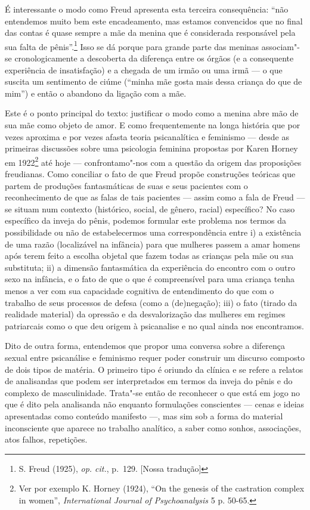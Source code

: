 É interessante o modo como Freud apresenta esta terceira consequência:
``não entendemos muito bem este encadeamento, mas estamos convencidos
que no final das contas é quase sempre a mãe da menina que é considerada
responsável pela sua falta de pênis''.\footnote{S. Freud (1925),
  \emph{op. cit.}, p.~129. {[}Nossa tradução{]}} Isso se dá porque para
grande parte das meninas associam"-se cronologicamente a descoberta da
diferença entre os órgãos (e a consequente experiência de insatisfação)
e a chegada de um irmão ou uma irmã --- o que suscita um sentimento de
ciúme (``minha mãe gosta mais dessa criança do que de mim'') e então o
abandono da ligação com a mãe.

Este é o ponto principal do texto: justificar o modo como a menina abre
mão de sua mãe como objeto de amor. E como frequentemente na longa
história que por vezes aproxima e por vezes afasta teoria psicanalítica
e feminismo --- desde as primeiras discussões sobre uma psicologia
feminina propostas por Karen Horney em 1922\footnote{Ver por exemplo K.
  Horney (1924), ``On the genesis of the castration complex in women'',
  \emph{International Journal of Psychoanalysis} 5 p. 50-65.} até hoje
--- confrontamo"-nos com a questão da origem das proposições freudianas.
Como conciliar o fato de que Freud propõe construções teóricas que
partem de produções fantasmáticas de suas e seus pacientes com o
reconhecimento de que as falas de tais pacientes --- assim como a fala de
Freud --- se situam num contexto (histórico, social, de gênero, racial)
específico? No caso específico da inveja do pênis, podemos formular
este problema nos termos da possibilidade ou não de estabelecermos uma
correspondência entre i) a existência de uma razão (localizável na
infância) para que mulheres passem a amar homens após terem feito a
escolha objetal que fazem todas as crianças pela mãe ou sua substituta;
ii) a dimensão fantasmática da experiência do encontro com o outro sexo
na infância, e o fato de que o que é compreensível para uma criança
tenha menos a ver com sua capacidade cognitiva de entendimento do que
com o trabalho de seus processos de defesa (como a (de)negação); iii) o
fato (tirado da realidade material) da opressão e da desvalorização das
mulheres em regimes patriarcais como o que deu origem à psicanalise e no
qual ainda nos encontramos.

Dito de outra forma, entendemos que propor uma conversa sobre a
diferença sexual entre psicanálise e feminismo requer poder construir um
discurso composto de dois tipos de matéria. O primeiro tipo é oriundo da
clínica e se refere a relatos de analisandas que podem ser interpretados
em termos da inveja do pênis e do complexo de masculinidade. Trata"-se
então de reconhecer o que está em jogo no que é dito pela analisanda não
enquanto formulações conscientes --- cenas e ideias apresentadas como
conteúdo manifesto ---, mas sim sob a forma do material inconsciente que
aparece no trabalho analítico, a saber como sonhos, associações, atos
falhos, repetições.

